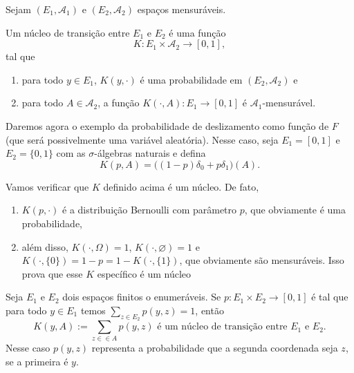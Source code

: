 Sejam $(E_1, \mathcal{A}_1)$ e $(E_2, \mathcal{A}_2)$ espaços mensuráveis.
\begin{definition}
  Um núcleo de transição entre $E_1$ e $E_2$ é uma função 
  \begin{equation}
    K: E_1 \times \mathcal{A}_2 \to [0,1],
  \end{equation}
  tal que
  \begin{enumerate}[\quad a)]
  \item para todo $y \in E_1$, $K(y,\cdot)$ é uma probabilidade em $(E_2, \mathcal{A}_2)$ e
  \item para todo $A \in \mathcal{A}_2$, a função $K(\cdot, A): E_1 \to [0,1]$ é $\mathcal{A}_1$-mensurável.
  \end{enumerate}
\end{definition}

\begin{example}
  \label{x:chance_deslizamento}
  Daremos agora o exemplo da probabilidade de deslizamento como função de $F$ (que será possivelmente uma variável aleatória).
  Nesse caso, seja $E_1 = [0,1]$ e $E_2 = \{0,1\}$ com as $\sigma$-álgebras naturais e defina
  \begin{equation}
    K(p, A) = \big( (1-p)\delta_0 + p \delta_1 \big) (A).
  \end{equation}
\end{example}

Vamos verificar que $K$ definido acima é um núcleo.
De fato,
\begin{enumerate}[\quad i)]
\item $K(p, \cdot)$ é a distribuição Bernoulli com parâmetro $p$, que obviamente é uma probabilidade,
\item além disso, $K(\cdot, \Omega) = 1$, $K(\cdot, \varnothing) = 1$ e $K(\cdot, \{0\}) = 1-p = 1 - K(\cdot,\{1\})$, que obviamente são mensuráveis.
Isso prova que esse $K$ específico é um núcleo
\end{enumerate}

\begin{example}[Discreto]
  \label{x:nucleo_discreto}
  Seja $E_1$ e $E_2$ dois espaços finitos o enumeráveis.
  Se $p: E_1 \times E_2 \to [0,1]$ é tal que para todo $y \in E_1$ temos $\sum_{z\in E_2} p(y, z) = 1$, então
  \begin{equation}
    K(y, A) := \sum_{z\in \in A} p(y, z) \text{ é um núcleo de transição entre $E_1$ e $E_2$.}
  \end{equation}
  Nesse caso $p(y,z)$ representa a probabilidade que a segunda coordenada seja $z$, se a primeira é $y$.
\end{example}


